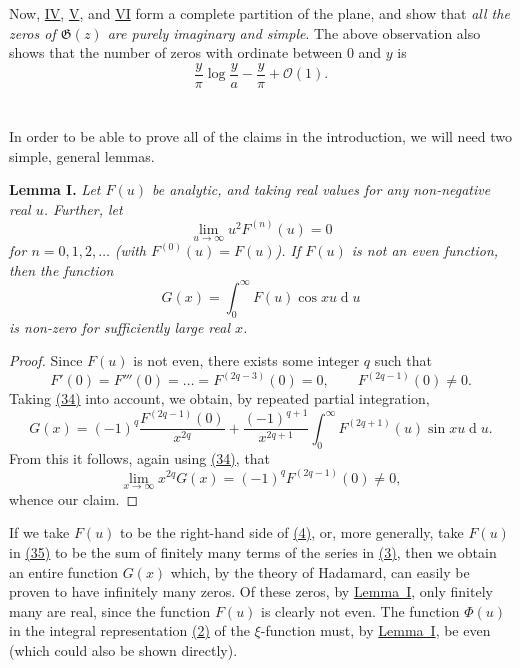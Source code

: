 \documentclass{article}
\theoremstyle{plain}
\newenvironment{itenv}[1]
  {\phantomsection\par\medskip\noindent\textbf{#1.}\itshape}
  {\par\medskip}
\newcommand{\dd}{\operatorname{d}\!}
\newcommand{\GG}{\mathfrak{G}}
\newcommand{\error}{\mathcal{O}}
\newcommand{\oldpage}[1]{\marginpar{\footnotesize$\Big\vert$ \textit{p.~#1}}}
\begin{document}
Now, \hyperref[IV]{IV}, \hyperref[V]{V}, and \hyperref[VI]{VI} form a complete partition of the plane, and show that \emph{all the zeros of $\GG(z)$ are purely imaginary and simple}.
The above observation also shows that the number of zeros with ordinate between $0$ and $y$ is
\[
  \frac{y}{\pi}\log\frac{y}{a} - \frac{y}{\pi} + \error(1).
\]


\section{}
\label{section4}

In order to be able to prove all of the claims in the introduction, we will need two simple, general lemmas.

\begin{itenv}{Lemma I}
\label{lemma1}
  Let $F(u)$ be analytic, and taking real values for any non-negative real $u$.
  Further, let
  \[
  \label{34}
    \lim_{u\to\infty} u^2 F^{(n)}(u) = 0
  \tag{34}
  \]
  for $n=0,1,2,\ldots$ (with $F^{(0)}(u)=F(u)$).
  If $F(u)$ is not an even function, then the function
  \[
  \label{35}
    G(x) = \int_0^\infty F(u)\cos xu \dd u
  \tag{35}
  \]
  is non-zero for sufficiently large real $x$.
\end{itenv}
\begin{proof}
  Since $F(u)$ is not even, there exists some integer $q$ such that
  \[
    F'(0) = F'''(0) = \ldots = F^{(2q-3)}(0) = 0,
    \qquad F^{(2q-1)}(0) \neq 0.
  \]
\oldpage{316}
  Taking \hyperref[34]{(34)} into account, we obtain, by repeated partial integration,
  \[
    G(x) = (-1)^q \frac{F^{(2q-1)}(0)}{x^{2q}} + \frac{{(-1)^{q+1}}}{x^{2q+1}} \int_0^\infty F^{(2q+1)}(u)\sin xu \dd u.
  \]
  From this it follows, again using \hyperref[34]{(34)}, that
  \[
    \lim_{x\to\infty} x^{2q}G(x) = (-1)^q F^{(2q-1)}(0) \neq 0,
  \]
  whence our claim.
\end{proof}

If we take $F(u)$ to be the right-hand side of \hyperref[4]{(4)}, or, more generally, take $F(u)$ in \hyperref[35]{(35)} to be the sum of finitely many terms of the series in \hyperref[3]{(3)}, then we obtain an entire function $G(x)$ which, by the theory of Hadamard, can easily be proven to have infinitely many zeros.
Of these zeros, by \hyperref[lemma1]{Lemma~I}, only finitely many are real, since the function $F(u)$ is clearly not even.
The function $\Phi(u)$ in the integral representation \hyperref[2]{(2)} of the $\xi$-function must, by \hyperref[lemma1]{Lemma~I}, be even (which could also be shown directly).
\end{document}
